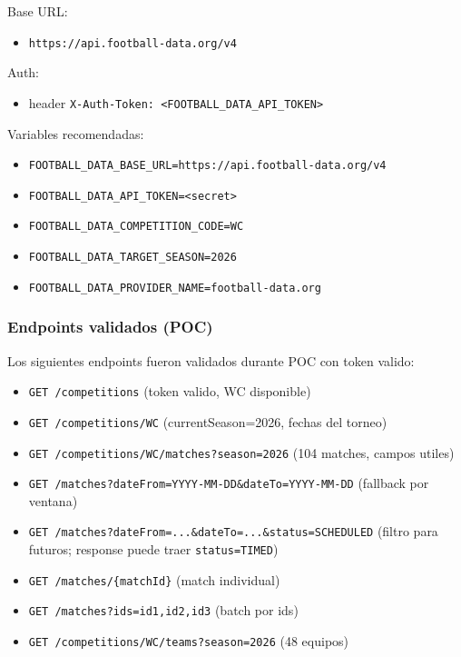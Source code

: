 Base URL:
\begin{itemize}
  \item \texttt{https://api.football-data.org/v4}
\end{itemize}

Auth:
\begin{itemize}
  \item header \texttt{X-Auth-Token: <FOOTBALL\_DATA\_API\_TOKEN>}
\end{itemize}

Variables recomendadas:
\begin{itemize}
  \item \texttt{FOOTBALL\_DATA\_BASE\_URL=https://api.football-data.org/v4}
  \item \texttt{FOOTBALL\_DATA\_API\_TOKEN=<secret>}
  \item \texttt{FOOTBALL\_DATA\_COMPETITION\_CODE=WC}
  \item \texttt{FOOTBALL\_DATA\_TARGET\_SEASON=2026}
  \item \texttt{FOOTBALL\_DATA\_PROVIDER\_NAME=football-data.org}
\end{itemize}

\subsubsection{Endpoints validados (POC)}

Los siguientes endpoints fueron validados durante POC con token valido:
\begin{itemize}
  \item \texttt{GET /competitions} (token valido, WC disponible)
  \item \texttt{GET /competitions/WC} (currentSeason=2026, fechas del torneo)
  \item \texttt{GET /competitions/WC/matches?season=2026} (104 matches, campos utiles)
  \item \texttt{GET /matches?dateFrom=YYYY-MM-DD\&dateTo=YYYY-MM-DD} (fallback por ventana)
  \item \texttt{GET /matches?dateFrom=...\&dateTo=...\&status=SCHEDULED} (filtro para futuros; response puede traer \texttt{status=TIMED})
  \item \texttt{GET /matches/\{matchId\}} (match individual)
  \item \texttt{GET /matches?ids=id1,id2,id3} (batch por ids)
  \item \texttt{GET /competitions/WC/teams?season=2026} (48 equipos)
\end{itemize}

